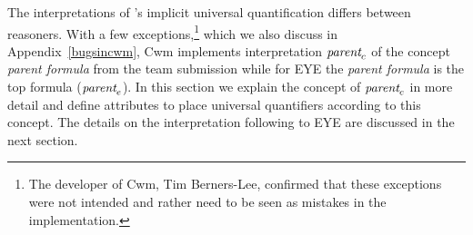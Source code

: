 The interpretations of \nthree's implicit universal quantification differs between reasoners. 
With a few exceptions,\footnote{The developer of Cwm, Tim Berners-Lee, confirmed that these exceptions were not intended
and rather need to be seen as mistakes in the implementation.} which we also discuss in Appendix~\ref{bugsincwm}, 
Cwm implements interpretation $\emph{parent}_c$ %
of the 
concept \emph{parent formula} from the \wwwc team submission while 
for EYE the \emph{parent formula} is the top formula ($\emph{parent}_e$). In this section we explain the concept of $\emph{parent}_c$ in more detail
and define attributes to place universal quantifiers according to this concept. 
The details on the interpretation following to EYE are discussed in the next section.
%
% 
% 

%
%
%


